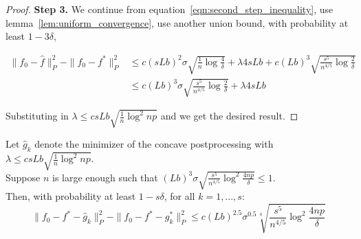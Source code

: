 \begin{proof}

\textbf{Step 3.} We continue from equation~\ref{eqn:second_step_inequality}, use lemma~\ref{lem:uniform_convergence}, use another union bound, with probability at least $1-3\delta$,

\begin{align}
\|f_0 - \hat{f} \|_P^2 - \| f_0 - f^* \|_P^2 
   &\leq c (sLb)^2 \sigma \sqrt{\frac{1}{n} \log \frac{4}{\delta}} 
 +\lambda 4 s L b + c (Lb)^3 \sqrt{ \frac{s^5}{n^{4/5}} \log \frac{2}{\delta}}
    \nonumber \\
&\leq c (Lb)^3 \sigma \sqrt{ \frac{s^5}{n^{4/5}} \log \frac{2}{\delta}} + \lambda 4 sLb
\end{align}

Substituting in $\lambda \leq c sLb \sqrt{\frac{1}{n} \log^2 np}$ and we get the desired result.

\end{proof}
 






\begin{theorem}
\label{thm:concave_consistent}
Let $\hat{g}_k$ denote the minimizer of the concave postprocessing with $\lambda \leq c sLb \sqrt{\frac{1}{n} \log^2 np}$.\\

Suppose $n$ is large enough such that $(Lb)^3 \sigma \sqrt{ \frac{s^5}{n^{4/5}} \log^2 \frac{4np}{\delta} } \leq 1$.\\

Then, with probability at least $1- s\delta$, for all $k=1,...,s$:\\
\[
\| f_0 - f^* - \hat{g}_k \|_P^2 - \| f_0 - f^* - g^*_k \|_P^2 \leq  c (Lb)^{2.5} \sigma^{0.5} \sqrt[4]{ \frac{s^5}{n^{4/5}} \log^2 \frac{4np}{\delta}} 
\]
\end{theorem}

